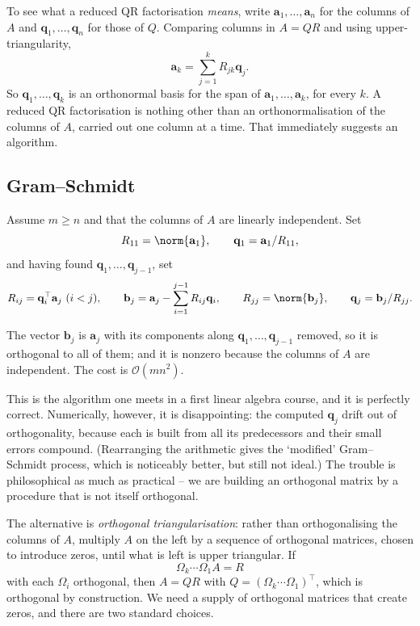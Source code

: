 To see what a reduced QR factorisation \emph{means}, write $\mathbf{a}_1, \dots, \mathbf{a}_n$ for the columns of $A$ and $\mathbf{q}_1, \dots, \mathbf{q}_n$ for those of $Q$. Comparing columns in $A = QR$ and using upper-triangularity,
$$
\mathbf{a}_k = \sum_{j=1}^{k}R_{jk}\mathbf{q}_j .
$$
So $\mathbf{q}_1, \dots, \mathbf{q}_k$ is an orthonormal basis for the span of $\mathbf{a}_1, \dots, \mathbf{a}_k$, for every $k$. A reduced QR factorisation is nothing other than an orthonormalisation of the columns of $A$, carried out one column at a time. That immediately suggests an algorithm.

\subsection{Gram--Schmidt}

\begin{method}
  Assume $m \geq n$ and that the columns of $A$ are linearly independent. Set
  $$
  R_{11} = \norm{\mathbf{a}_1}, \qquad \mathbf{q}_1 = \mathbf{a}_1/R_{11},
  $$
  and having found $\mathbf{q}_1, \dots, \mathbf{q}_{j-1}$, set
  $$
  R_{ij} = \mathbf{q}_i^\top\mathbf{a}_j \ (i < j), \qquad \mathbf{b}_j = \mathbf{a}_j - \sum_{i=1}^{j-1}R_{ij}\mathbf{q}_i, \qquad R_{jj} = \norm{\mathbf{b}_j}, \qquad \mathbf{q}_j = \mathbf{b}_j/R_{jj}.
  $$
\end{method}

The vector $\mathbf{b}_j$ is $\mathbf{a}_j$ with its components along $\mathbf{q}_1, \dots, \mathbf{q}_{j-1}$ removed, so it is orthogonal to all of them; and it is nonzero because the columns of $A$ are independent. The cost is $\mathcal{O}(mn^2)$.

This is the algorithm one meets in a first linear algebra course, and it is perfectly correct. Numerically, however, it is disappointing: the computed $\mathbf{q}_j$ drift out of orthogonality, because each is built from all its predecessors and their small errors compound. (Rearranging the arithmetic gives the `modified' Gram--Schmidt process, which is noticeably better, but still not ideal.) The trouble is philosophical as much as practical -- we are building an orthogonal matrix by a procedure that is not itself orthogonal.

The alternative is \emph{orthogonal triangularisation}: rather than orthogonalising the columns of $A$, multiply $A$ on the left by a sequence of orthogonal matrices, chosen to introduce zeros, until what is left is upper triangular. If
$$
\Omega_k \cdots \Omega_1 A = R
$$
with each $\Omega_i$ orthogonal, then $A = QR$ with $Q = (\Omega_k\cdots\Omega_1)^\top$, which is orthogonal by construction. We need a supply of orthogonal matrices that create zeros, and there are two standard choices.

